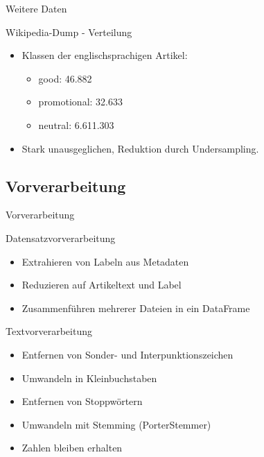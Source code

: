 \documentclass[aspectratio=169]{beamer} %
\begin{document}
\begin{frame}{Weitere Daten}
    \begin{block}{Wikipedia-Dump - Verteilung}
        \begin{itemize}
            \item Klassen der englischsprachigen Artikel:
                  \begin{itemize}
                      \item good: 46.882
                      \item promotional: 32.633
                      \item neutral: 6.611.303
                  \end{itemize}
            \item Stark unausgeglichen, Reduktion durch Undersampling.
        \end{itemize}
    \end{block}
\end{frame}

\subsection{Vorverarbeitung}

\begin{frame}{Vorverarbeitung}
    \begin{block}{Datensatzvorverarbeitung}
        \begin{itemize}
            \item Extrahieren von Labeln aus Metadaten
            \item Reduzieren auf Artikeltext und Label
            \item Zusammenführen mehrerer Dateien in ein DataFrame
        \end{itemize}
    \end{block}
    \begin{block}{Textvorverarbeitung}
        \begin{itemize}
            \item Entfernen von Sonder- und Interpunktionszeichen
            \item Umwandeln in Kleinbuchstaben
            \item Entfernen von Stoppwörtern
            \item Umwandeln mit Stemming (PorterStemmer)
            \item Zahlen bleiben erhalten
        \end{itemize}
    \end{block}
\end{frame}
\end{document}
